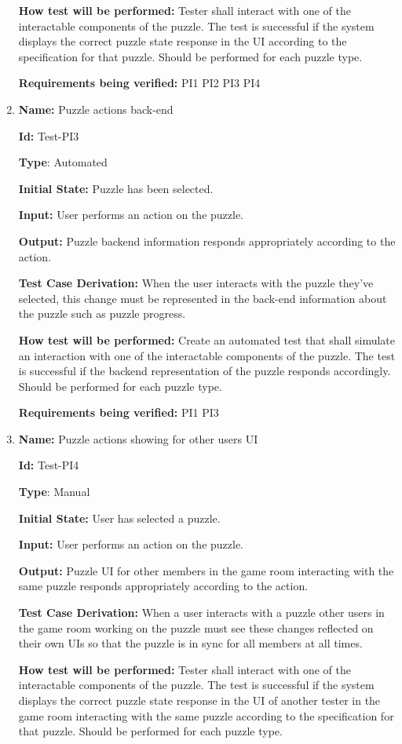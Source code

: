 \documentclass[12pt, titlepage]{article}
\begin{document}
\begin{enumerate}
\textbf{How test will be performed:}
Tester shall interact with one of the interactable components of the puzzle. The test is successful if the system displays the correct puzzle state response in the UI according to the specification for that puzzle. Should be performed for each puzzle type.

\textbf{Requirements being verified: } PI1 PI2 PI3 PI4

\item{\textbf{Name:} Puzzle actions back-end}

\textbf{Id:} Test-PI3

\textbf{Type}: Automated

\textbf{Initial State:} Puzzle has been selected.

\textbf{Input:} User performs an action on the puzzle.

\textbf{Output:} Puzzle backend information responds appropriately according to the action.

\textbf{Test Case Derivation:}
When the user interacts with the puzzle they've selected, this change must be represented in the back-end information about the puzzle such as puzzle progress.

\textbf{How test will be performed:}
Create an automated test that shall simulate an interaction with one of the interactable components of the puzzle. The test is successful if the backend representation of the puzzle responds accordingly. Should be performed for each puzzle type.

\textbf{Requirements being verified: } PI1 PI3

\item{\textbf{Name:} Puzzle actions showing for other users UI}

\textbf{Id:} Test-PI4

\textbf{Type}: Manual

\textbf{Initial State:} User has selected a puzzle.

\textbf{Input:} User performs an action on the puzzle.

\textbf{Output:} Puzzle UI for other members in the game room interacting with the same puzzle responds appropriately according to the action.

\textbf{Test Case Derivation:}
When a user interacts with a puzzle other users in the game room working on the puzzle must see these changes reflected on their own UIs so that the puzzle is in sync for all members at all times.

\textbf{How test will be performed:}
Tester shall interact with one of the interactable components of the puzzle. The test is successful if the system displays the correct puzzle state response in the UI of another tester in the game room interacting with the same puzzle according to the specification for that puzzle. Should be performed for each puzzle type.


\end{enumerate}
\end{document}
